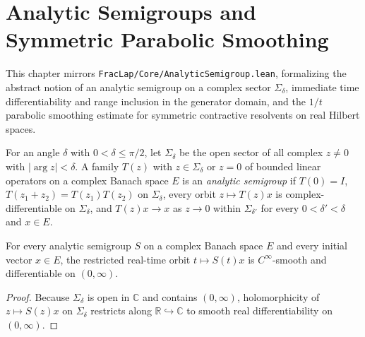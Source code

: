 \chapter{Analytic Semigroups and Symmetric Parabolic Smoothing}

This chapter mirrors \texttt{FracLap/Core/AnalyticSemigroup.lean}, formalizing the abstract notion of an analytic semigroup on a complex sector $\Sigma_\delta$, immediate time differentiability and range inclusion in the generator domain, and the $1/t$ parabolic smoothing estimate for symmetric contractive resolvents on real Hilbert spaces.

\begin{definition}\label{def:analytic_semigroup}
\leanok
For an angle $\delta$ with $0 < \delta \le \pi/2$, let $\Sigma_\delta$ be the open sector of all complex $z \neq 0$ with $\lvert \arg z \rvert < \delta$. A family $T(z)$ with $z \in \Sigma_\delta$ or $z = 0$ of bounded linear operators on a complex Banach space $E$ is an \emph{analytic semigroup} if $T(0) = I$, $T(z_1 + z_2) = T(z_1)T(z_2)$ on $\Sigma_\delta$, every orbit $z \mapsto T(z)x$ is complex-differentiable on $\Sigma_\delta$, and $T(z)x \to x$ as $z \to 0$ within $\Sigma_{\delta'}$ for every $0 < \delta' < \delta$ and $x \in E$.
\end{definition}

\begin{proposition}\label{prop:analytic_diff}
\leanok
For every analytic semigroup $S$ on a complex Banach space $E$ and every initial vector $x \in E$, the restricted real-time orbit $t \mapsto S(t)x$ is $C^\infty$-smooth and differentiable on $(0, \infty)$.
\end{proposition}

\begin{proof}
\leanok
Because $\Sigma_\delta$ is open in $\mathbb{C}$ and contains $(0, \infty)$, holomorphicity of $z \mapsto S(z)x$ on $\Sigma_\delta$ restricts along $\mathbb{R} \hookrightarrow \mathbb{C}$ to smooth real differentiability on $(0, \infty)$.
\end{proof}

